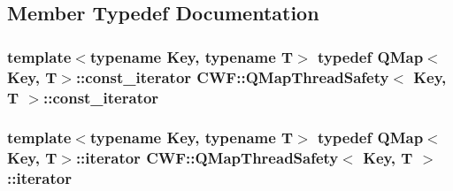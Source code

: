 \subsection{Member Typedef Documentation}
\hypertarget{class_c_w_f_1_1_q_map_thread_safety_ae9f60ca27b6f4af8753cf15211fe5c70}{
\subsubsection[{const\+\_\+iterator}]{\setlength{\rightskip}{0pt plus 5cm}template$<$typename Key, typename T$>$ typedef Q\+Map$<$Key, T$>$\+::{\bf const\+\_\+iterator} {\bf C\+W\+F\+::\+Q\+Map\+Thread\+Safety}$<$ Key, T $>$\+::{\bf const\+\_\+iterator}}}\label{class_c_w_f_1_1_q_map_thread_safety_ae9f60ca27b6f4af8753cf15211fe5c70}
\hypertarget{class_c_w_f_1_1_q_map_thread_safety_a3c4ab1dfd3da9557e0f2ea9e480466f9}{
\subsubsection[{iterator}]{\setlength{\rightskip}{0pt plus 5cm}template$<$typename Key, typename T$>$ typedef Q\+Map$<$Key, T$>$\+::{\bf iterator} {\bf C\+W\+F\+::\+Q\+Map\+Thread\+Safety}$<$ Key, T $>$\+::{\bf iterator}}}\label{class_c_w_f_1_1_q_map_thread_safety_a3c4ab1dfd3da9557e0f2ea9e480466f9}


